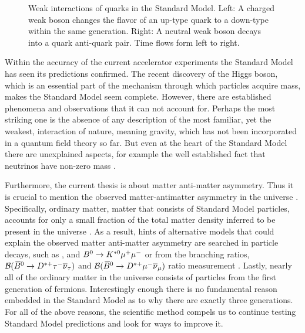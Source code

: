 \begin{figure}[t]
  \centering
  \begin{subfigure}{0.49\textwidth}
    \hspace{1.3cm}
    \scalebox{1.}{}
    \caption{}
    \label{CC_WeakInteractions}
  \end{subfigure}%
  \hfill%
  \begin{subfigure}{0.49\textwidth}
    \hspace{1.3cm}
    \scalebox{1.}{}
    \caption{}
    \label{NC_WeakInteractions}
  \end{subfigure}
  \caption{Weak interactions of quarks in the Standard Model. Left: A charged weak boson changes the flavor
           of an up-type quark to a down-type within the same generation.
           Right: A neutral weak boson decays into a quark anti-quark pair. Time flows form left to right.}
\label{WeakInteractions}
\end{figure}

Within the accuracy of the current accelerator experiments the Standard Model has seen its predictions confirmed.
The recent discovery of the Higgs boson, which is an essential part of the mechanism through which particles acquire mass,
makes the Standard Model seem complete. However, there are established phenomena and observations that it can not
account for. Perhaps the most striking one is the absence of any description of the most familiar, yet the weakest,
interaction of nature, meaning gravity, which has not been incorporated in a quantum field theory so far.
But even at the heart of the Standard Model there are unexplained aspects, for example the well established
fact that neutrinos have non-zero mass \cite{nu-mass-superkam,nu-mass-kamland,nu-mass-sno,nu-mass-daya}.

Furthermore, the current thesis is about matter anti-matter asymmetry. Thus it is crucial to mention
the observed matter-antimatter asymmetry in the universe \cite{more-cpv-huet,more-cpv-gavela_I,more-cpv-gavela_II}.
Specifically, ordinary matter, \ie matter that consists of Standard Model particles, accounts for only a small
fraction of the total matter density inferred to be present in the universe \cite{dmatter-Hinshaw}.
As a result, hints of alternative models that could explain the observed matter anti-matter asymmetry are
searched in particle decays, such as \Bsmm, \Bdmm \cite{CMS:2014xfa} and $B^0 \rightarrow K^{*0} \mu^+\mu^-$\cite{Aaij:2015oid}
or from the branching ratios, ${\cal B}(\kern 0.18em\overline{\kern -0.18em B}{}^0 \rightarrow D^{*+} \tau^-\overline{\nu}_\tau)$ and ${\cal B}(\kern 0.18em\overline{\kern -0.18em B}{}^0 \rightarrow D^{*+} \mu^-\overline{\nu}_\mu)$ ratio measurement \cite{Aaij:2015yra}.
Lastly, nearly all of the ordinary matter in the universe consists of particles from the first generation
of fermions. Interestingly enough there is no fundamental reason embedded in the Standard Model
as to why there are exactly three generations. For all of the above reasons, the scientific method compels
us to continue testing Standard Model predictions and look for ways to improve it.

